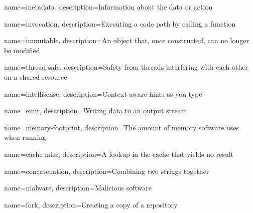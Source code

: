 {
	name={metadata},
	description={Information about the data or action}
}

{
	name={invocation},
	description={Executing a code path by calling a function}
}



{
	name={immutable},
	description={An object that, once constructed, can no longer be modified}
}

{
	name={thread-safe},
	description={Safety from threads interfering with each other on a shared resource}
}

{
	name={intellisense},
	description={Context-aware hints as you type}
}


{
	name={emit},
	description={Writing data to an output stream}
}

{
	name={memory-footprint},
	description={The amount of memory software uses when running}
}



{
	name={cache miss},
	description={A lookup in the cache that yields no result}
}

{
	name={concatenation},
	description={Combining two strings together}
}


{
	name={malware},
	description={Malicious software}
}


{
	name={fork},
	description={Creating a copy of a repository}
}

